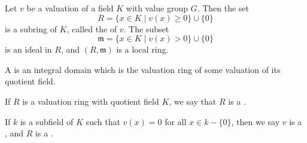 Let $v$ be a valuation of a field $K$ with value group $G$. Then the set
$$R = \{x \in K \mid v(x) \geq 0\} \cup \{0\}$$
is a subring of $K$, called the  of $v$. The subset
$$\mathfrak{m} = \{x \in K \mid v(x) > 0\} \cup \{0\}$$
is an ideal in $R$, and $(R, \mathfrak{m})$ is a local ring.

A  is an integral domain which is the valuation ring of some valuation of its quotient field.

If $R$ is a valuation ring with quotient field $K$, we say that $R$ is a .

If $k$ is a subfield of $K$ such that $v(x) = 0$ for all $x \in k - \{0\}$, then we say $v$ is a , and $R$ is a .
